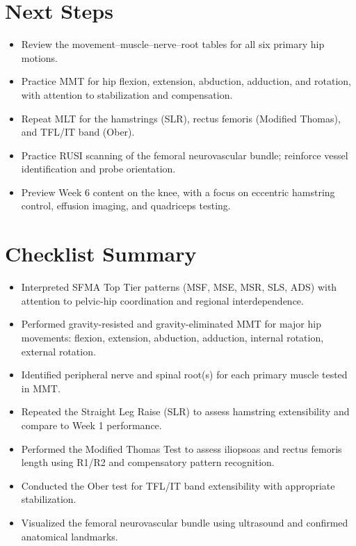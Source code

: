 \section*{Next Steps}

\begin{itemize}
  \item Review the movement–muscle–nerve–root tables for all six primary hip motions.
  \item Practice MMT for hip flexion, extension, abduction, adduction, and rotation, with attention to stabilization and compensation.
  \item Repeat MLT for the hamstrings (SLR), rectus femoris (Modified Thomas), and TFL/IT band (Ober).
  \item Practice RUSI scanning of the femoral neurovascular bundle; reinforce vessel identification and probe orientation.
  \item Preview Week 6 content on the knee, with a focus on eccentric hamstring control, effusion imaging, and quadriceps testing.
\end{itemize}

\section*{Checklist Summary}

\begin{itemize}
  \item [$\square$] Interpreted SFMA Top Tier patterns (MSF, MSE, MSR, SLS, ADS) with attention to pelvic-hip coordination and regional interdependence.
  \item [$\square$] Performed gravity-resisted and gravity-eliminated MMT for major hip movements: flexion, extension, abduction, adduction, internal rotation, external rotation.
  \item [$\square$] Identified peripheral nerve and spinal root(s) for each primary muscle tested in MMT.
  \item [$\square$] Repeated the Straight Leg Raise (SLR) to assess hamstring extensibility and compare to Week 1 performance.
  \item [$\square$] Performed the Modified Thomas Test to assess iliopsoas and rectus femoris length using R1/R2 and compensatory pattern recognition.
  \item [$\square$] Conducted the Ober test for TFL/IT band extensibility with appropriate stabilization.
  \item [$\square$] Visualized the femoral neurovascular bundle using ultrasound and confirmed anatomical landmarks.
\end{itemize}
